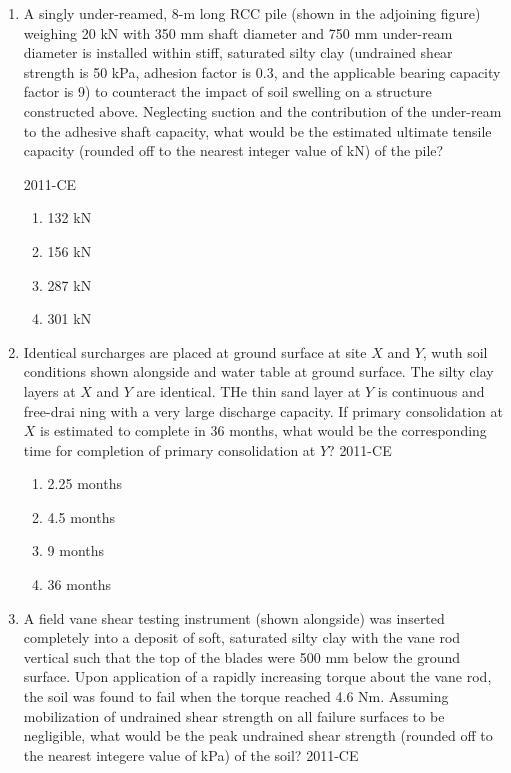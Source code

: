 \documentclass[journal,12pt,onecolumn]{IEEEtran}
\theoremstyle{remark}
\begin{document}
\begin{enumerate}
\item A singly under-reamed, 8-m long RCC pile (shown in the adjoining figure) weighing 20 kN with 350 mm shaft diameter and 750 mm under-ream diameter is installed within stiff, saturated silty clay (undrained shear strength is 50 kPa, adhesion factor is 0.3, and the applicable bearing capacity factor is 9) to counteract the impact of soil swelling on a structure constructed above. Neglecting suction and the contribution of the under-ream to the adhesive shaft capacity, what would be the estimated ultimate tensile capacity (rounded off to the nearest integer value of kN) of the pile?

	\hfill{2011-CE}

\begin{figure}[ht]
\centering

\end{figure}
	\begin{multicols}{4}
	\begin{enumerate}
		\item 132 kN
		\item 156 kN
		\item 287 kN
		\item 301 kN
	\end{enumerate}
	\end{multicols}

\item Identical surcharges are placed at ground surface at site $X$ and $Y$, wuth soil conditions shown alongside and water table at ground surface. The silty clay layers at $X$ and $Y$ are identical. THe thin sand layer at $Y$ is continuous and free-drai ning with a very large discharge capacity. If primary consolidation at $X$ is estimated to complete in 36 months, what would be the corresponding time for completion of primary consolidation at $Y$?
	\hfill{2011-CE}

\begin{figure}[ht]
\centering

\end{figure}
	\begin{multicols}{4}
	\begin{enumerate}
		\item 2.25 months
		\item 4.5 months
		\item 9 months
		\item 36 months
	\end{enumerate}
	\end{multicols}

\item A field vane shear testing instrument (shown alongside) was inserted completely into a deposit of soft, saturated silty clay with the vane rod vertical such that the top of the blades were 500 mm below the ground surface. Upon application of a rapidly increasing torque about the vane rod, the soil was found to fail when the torque reached 4.6 Nm. Assuming mobilization of undrained shear strength on all failure surfaces to be negligible, what would be the peak undrained shear strength (rounded off to the nearest integere value of kPa) of the soil?
	\hfill{2011-CE}


\end{enumerate}
\end{document}
